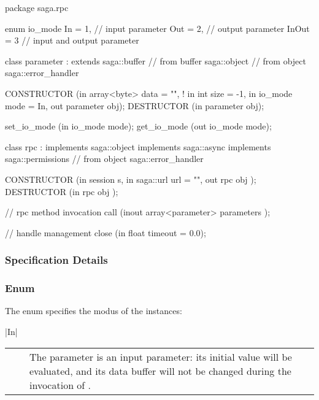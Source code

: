  \begin{myspec}
  package saga.rpc 
  {
    enum io_mode 
    {
      In    = 1,          // input  parameter
      Out   = 2,          // output parameter
      InOut = 3           // input and output parameter
    }
 
    class parameter : extends saga::buffer
               // from buffer saga::object
               // from object saga::error_handler
    {
      CONSTRUCTOR (in    array<byte>       data = "",
!                  in    int               size = -1,
                   in    io_mode           mode = In,
                   out   parameter         obj);
      DESTRUCTOR  (in    parameter         obj);
 
      set_io_mode (in    io_mode           mode);
      get_io_mode (out   io_mode           mode);
    }
 
    class rpc : implements   saga::object
                implements   saga::async   
                implements   saga::permissions
             // from object  saga::error_handler
    {
      CONSTRUCTOR (in    session           s,
                   in    saga::url         url = "", 
                   out   rpc               obj          );
      DESTRUCTOR  (in    rpc               obj          );
 
      // rpc method invocation
      call        (inout array<parameter>  parameters   );
 
      // handle management
      close       (in    float             timeout = 0.0);
    }
  }
 \end{myspec}
 
 \subsubsection{Specification Details}
 
  \subsubsection*{Enum }
 
   The  enum specifies the modus of the
    instances:
 
   |In|\\[1.5mm]
   \begin{tabular}{cp{110mm}}
     ~~ & The parameter is an input parameter: its initial
          value will be evaluated, and its data buffer will
          not be changed during the invocation of \T{call()}.
   \end{tabular}
 
